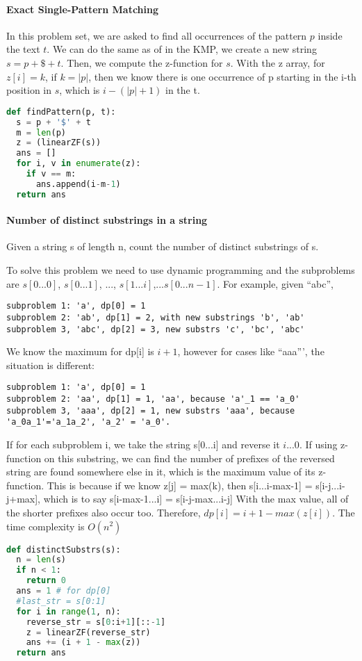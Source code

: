 \documentclass[../main.tex]{subfiles}
\begin{document}
\paragraph{Exact Single-Pattern Matching} In this problem set, we are asked to find all occurrences of the pattern $p$ inside the text $t$. We can do the same as of in the KMP, we create a new string $s=p+\$+t$. Then, we compute the z-function for $s$. With the z array, for $z[i]=k$, if $k=|p|$, then we know there is one occurrence of p starting in the i-th position in $s$, which is $i-(|p|+1)$ in the t. 
\begin{lstlisting}[language=Python]
def findPattern(p, t):
  s = p + '$' + t
  m = len(p)
  z = (linearZF(s))
  ans = []
  for i, v in enumerate(z):
    if v == m:
      ans.append(i-m-1)
  return ans
\end{lstlisting}

\paragraph{Number of distinct substrings in a string} Given a string s of length n, count the number of distinct substrings of s. 

To solve this problem we need to use dynamic programming and the subproblems are $s[0...0]$, $s[0...1]$, ..., $s[1...i]$,...$s[0...n-1]$. For example, given ``abc'', 
\begin{lstlisting}[numbers=none]
subproblem 1: 'a', dp[0] = 1
subproblem 2: 'ab', dp[1] = 2, with new substrings 'b', 'ab'
subproblem 3, 'abc', dp[2] = 3, new substrs 'c', 'bc', 'abc'
\end{lstlisting}

We know the maximum for dp[i] is $i+1$, however for cases like ``aaa''', the situation is different:
\begin{lstlisting}[numbers=none]
subproblem 1: 'a', dp[0] = 1
subproblem 2: 'aa', dp[1] = 1, 'aa', because 'a'_1 == 'a_0'
subproblem 3, 'aaa', dp[2] = 1, new substrs 'aaa', because 'a_0a_1'='a_1a_2', 'a_2' = 'a_0'. 
\end{lstlisting}

If for each subproblem i, we take the string s[0...i] and reverse it $i...0$. If using z-function on this substring, we can find the number of prefixes of the reversed string are found somewhere else in it, which is the maximum value of its z-function.  This is because if we know z[j] = max(k), then s[i...i-max-1] = s[i-j...i-j+max], which is to say s[i-max-1...i] = s[i-j-max...i-j]
With the max value, all of the shorter prefixes also occur too. Therefore, $dp[i] = i+1 - max(z[i])$. The time complexity is $O(n^2)$
\begin{lstlisting}[language=Python]
def distinctSubstrs(s):
  n = len(s)
  if n < 1:
    return 0
  ans = 1 # for dp[0]
  #last_str = s[0:1]
  for i in range(1, n):
    reverse_str = s[0:i+1][::-1]
    z = linearZF(reverse_str)
    ans += (i + 1 - max(z))
  return ans
\end{lstlisting}
\end{document}
